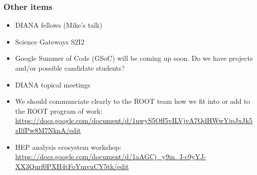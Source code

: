 \begin{frame}
\frametitle{Other items}

\begin{itemize}
\item DIANA fellows (Mike's talk)
\item Science Gateways S2I2
\item Google Summer of Code (GSoC) will be coming up soon. Do we have projects and/or possible candidate students?
\item DIANA topical meetings
\item We should communciate clearly to the ROOT team how we fit into or add to the ROOT program of work: \url{https://docs.google.com/document/d/1nwyS5Off5vILVjvA7QdHWwYipJxJk5zIlfPw8M7NknA/edit}
\item HEP analysis ecosystem workshop: \url{https://docs.google.com/document/d/1aAGCj_y9in_I-c9yYJ-XX3Qurf0PXH4tFoYmvuCY5tk/edit}
\end{itemize}

\end{frame}


